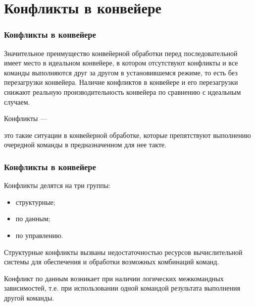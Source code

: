 \documentclass{beamer}
\begin{document}
\section{Конфликты в конвейере}

\begin{frame}
\frametitle{Конфликты в конвейере}
Значительное преимущество конвейерной обработки перед последовательной имеет место в идеальном конвейере, в котором отсутствуют конфликты и все команды выполняются друг за другом в установившемся режиме, то есть без перезагрузки конвейера. Наличие конфликтов в конвейере и его перезагрузки снижают реальную производительность конвейера по сравнению с идеальным случаем.

\begin{block}{Конфликты —}

это такие ситуации в конвейерной обработке, которые препятствуют выполнению очередной команды в предназначенном для нее такте.
\end{block}
\end{frame}


\begin{frame}
\frametitle{Конфликты в конвейере}

Конфликты делятся на три группы:

\begin{itemize}
\item структурные;
\item по данным;
\item по управлению.

\end{itemize}

Структурные конфликты вызваны недостаточностью ресурсов вычислительной системы для обеспечения и обработки возможных комбинаций команд.

Конфликт по данным возникает при наличии логических межкомандных зависимостей, т.е. при использовании одной командой результата выполнения другой команды.

\end{frame}

\end{document}
